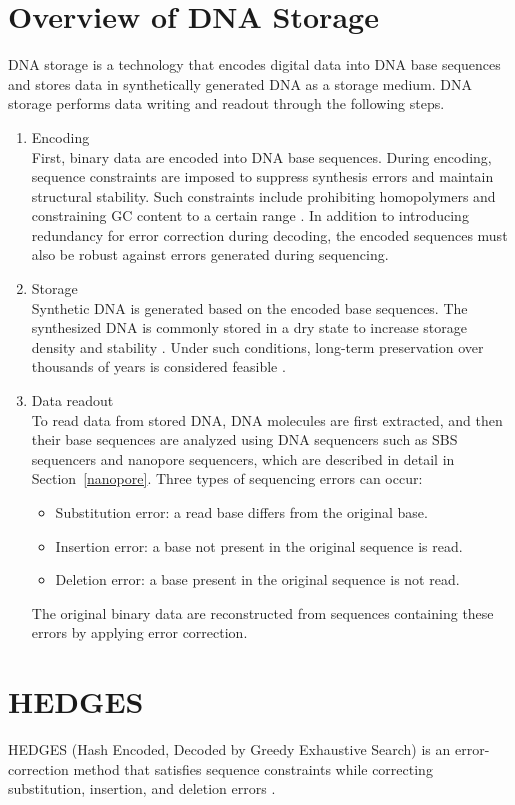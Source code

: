 \documentclass[sotsuron]{kuee}
\begin{document}
\section{Overview of DNA Storage} \label{dna_storage}
DNA storage is a technology that encodes digital data into DNA base sequences
and stores data in synthetically generated DNA as a storage medium.
DNA storage performs data writing and readout through the following steps.
\begin{enumerate}
  \item Encoding\\
  First, binary data are encoded into DNA base sequences.
  During encoding, sequence constraints are imposed to suppress synthesis
  errors and maintain structural stability. Such constraints include
  prohibiting homopolymers and constraining GC content to a certain range
  \cite{Gervasio}.
  In addition to introducing redundancy for error correction during decoding,
  the encoded sequences must also be robust against errors generated during
  sequencing.
  \item Storage\\
  Synthetic DNA is generated based on the encoded base sequences. The synthesized
  DNA is commonly stored in a dry state to increase storage density and stability
  \cite{landsman2023the}.
  Under such conditions, long-term preservation over thousands of years is
  considered feasible \cite{Grass2015Robust}.
  \item Data readout\\
  To read data from stored DNA, DNA molecules are first extracted, and then
  their base sequences are analyzed using DNA sequencers such as SBS sequencers
  and nanopore sequencers, which are described in detail in
  Section~\ref{nanopore}.
  Three types of sequencing errors can occur:
  \begin{itemize}
    \item Substitution error: a read base differs from the original base.
    \item Insertion error: a base not present in the original sequence is read.
    \item Deletion error: a base present in the original sequence is not read.
  \end{itemize}
  The original binary data are reconstructed from sequences containing these
  errors by applying error correction.
\end{enumerate}

\section{HEDGES} \label{hedges}
HEDGES (Hash Encoded, Decoded by Greedy Exhaustive Search) is an
error-correction method that satisfies sequence constraints while correcting
substitution, insertion, and deletion errors \cite{HEDGES}.
\end{document}
